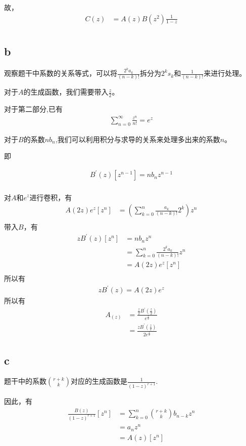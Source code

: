 \documentclass[]{article}
\begin{document}
故，
\begin{align}
    C(z) &= A(z)B(z^2)\frac{1}{1-z}\\
\end{align}

\subsection*{b}
观察题干中系数的关系等式，可以将$\frac{2^ka_k}{(n-k)!}$拆分为$2^ks_k$和$\frac{1}{(n-k)!}$来进行处理。\par
对于$A$的生成函数，我们需要带入$\frac{z}{2}$。\par 
对于第二部分,已有
\begin{align}
    \sum_{n=0}^{\infty}\frac{z^n}{n!} = e^z
\end{align}
\par 
对于$B$的系数$nb_n$,我们可以利用积分与求导的关系来处理多出来的系数$n$。
\par 
即

\begin{align}
    B^{'}(z)[z^{n-1}] = nb_n z^{n-1}\\
\end{align}
\par 

对$A$和$e^z$进行卷积，有
\begin{align}
    A(2z)e^z[z^n] &= (\sum_{k=0}^{n}\frac{a_k}{(n-k)!}2^k)z^n\\
\end{align}
带入$B$，有
\begin{align}
    zB^{'}(z)[z^n] &= nb_nz^n\\
    &= \sum_{k=0}^{n}\frac{2^ka_k}{(n-k)!}z^n\\
    &= A(2z)e^z[z^n]\\
\end{align}
所以有
\begin{align}
    zB^{'}(z) = A(2z)e^z
\end{align}
所以有
\begin{align}
    A_(z) &= \frac{\frac{z}{2}B^{'}(\frac{z}{2})}{e^{\frac{z}{2}}}\\
    &=\frac{zB^{'}(\frac{z}{2})}{2e^{\frac{z}{2}}}
\end{align}

\subsection*{c}
题干中的系数$\binom{r+k}{k}$对应的生成函数是$\frac{1}{(1-z)^{r+1}}$.\par 
因此，有
\begin{align}
    \frac{B(z)}{(1-z)^{r+1}}[z^n] &= \sum_{k=0}^{n}\binom{r+k}{k}b_{n-k}z^n\\
    &=a_n z^{n}\\
    &=A(z)[z^n]\\
\end{align}
\end{document}
